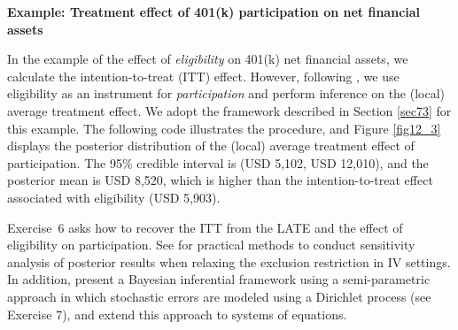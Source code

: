 \textbf{Example: Treatment effect of 401(k) participation on net financial assets}

In the example of the effect of \textit{eligibility} on 401(k) net financial assets, we calculate the intention-to-treat (ITT) effect. However, following \cite{chernozhukov2004effects}, we use eligibility as an instrument for \textit{participation} and perform inference on the (local) average treatment effect. We adopt the framework described in Section \ref{sec73} for this example. The following code illustrates the procedure, and Figure \ref{fig12_3} displays the posterior distribution of the (local) average treatment effect of participation. The 95\% credible interval is (USD 5,102, USD 12,010), and the posterior mean is USD 8,520, which is higher than the intention-to-treat effect associated with eligibility (USD 5,903). 

Exercise~6 asks how to recover the ITT from the LATE and the effect of eligibility on participation. See \cite{Conley2012} for practical methods to conduct sensitivity analysis of posterior results when relaxing the exclusion restriction in IV settings. In addition, \cite{conley2008semi} present a Bayesian inferential framework using a semi-parametric approach in which stochastic errors are modeled using a Dirichlet process (see Exercise 7), and \cite{ramirez2024welfare} extend this approach to systems of equations.


